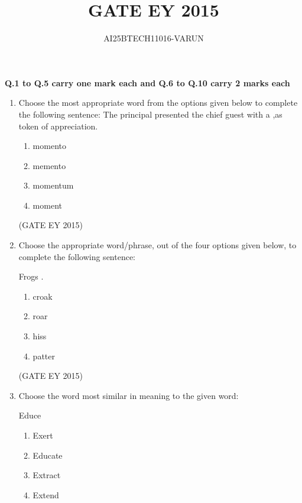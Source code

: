 \documentclass[journal,12pt,onecolumn]{IEEEtran}
\title{GATE EY 2015}
\author{AI25BTECH11016-VARUN}
\theoremstyle{remark}
\begin{document}
\maketitle

\textbf{Q.1 to Q.5 carry one mark each and Q.6 to Q.10 carry 2 marks each}
\begin{enumerate}
 \item 
Choose the most appropriate word from the options given below to complete the following sentence:
The principal presented the chief guest with a  \underline{\hspace{1.5cm}},as token of appreciation.
\begin{multicols}{4}
\begin{enumerate}
    
\item momento
\item memento
\item momentum
\item moment

    \end{enumerate}
    \end{multicols}
\hfill{(GATE EY 2015)}
\item Choose the appropriate word/phrase, out of the four options given below, to complete the following sentence:

Frogs  \underline{\hspace{1.5cm}}.

\begin{multicols}{4}
\begin{enumerate}
    
\item croak
\item roar
\item hiss
\item patter

    \end{enumerate}
    \end{multicols}
\hfill{(GATE EY 2015)}

\item 
Choose the word most similar in meaning to the given word:

Educe

\begin{multicols}{4}
\begin{enumerate}
    
\item Exert
\item Educate
\item Extract
\item Extend


\end{enumerate}
\end{multicols}
\end{enumerate}
\end{document}
